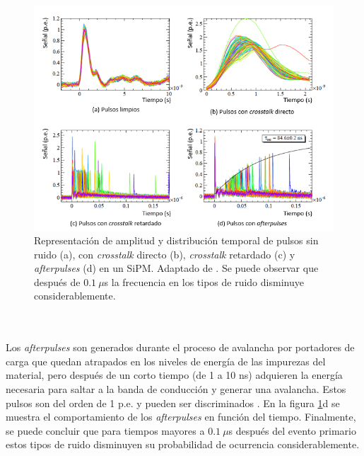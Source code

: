 \begin{figure}[h!]
\begin{centering}
  \includegraphics[width=\textwidth]{Images/Pulses_with_noise.PNG}
    \caption{Representación de amplitud y distribución temporal de pulsos sin ruido (a), con \textit{crosstalk} directo (b), \textit{crosstalk} retardado (c)  y \textit{afterpulses} (d) en un SiPM. Adaptado de \citep{charct_noise}. Se puede observar que después de  $0.1~\mu$s la frecuencia en los tipos de ruido disminuye considerablemente.}
    \label{fig:noise}  
  \par\end{centering}
\end{figure}
\\ \\
Los \textit{afterpulses} son generados durante el proceso de avalancha por portadores de carga que quedan atrapados en los niveles de energía de las impurezas  del material, pero después de un corto tiempo  (de 1 a 10 ns) adquieren la energía necesaria para saltar a la banda de conducción y generar una avalancha. Estos pulsos son del orden de 1 p.e. y pueden ser discriminados \citep{MPPC_note}. En la figura   \ref{fig:noise}d se muestra el comportamiento de los \textit{afterpulses} en función del tiempo. Finalmente, se puede concluir que para tiempos mayores a $0.1~\mu$s después del evento primario estos tipos de ruido disminuyen su probabilidad de ocurrencia considerablemente.       
